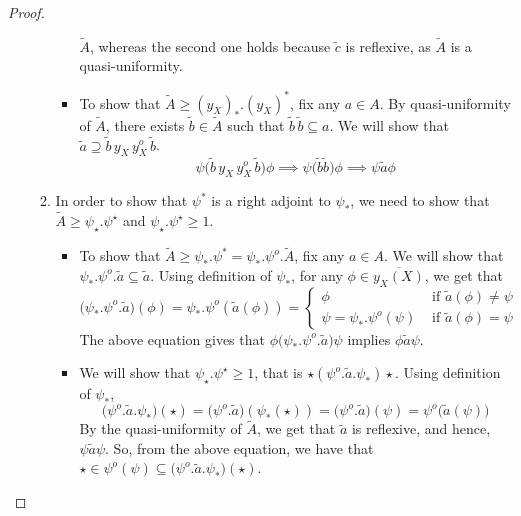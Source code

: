 \documentclass[18pt,a4paper]{article}
\theoremstyle{definition}
\begin{document}
\begin{proof}
\begin{enumerate}[label=(\roman*)]
\begin{enumerate}[label=\Roman*]
\begin{itemize}
								$\tilde{A}$, whereas the second one holds because $\tilde{c}$ is reflexive, as $\tilde{A}$ is a
								quasi-uniformity.
							\item To show that $\tilde{A} \geq (y_X^{})_*.(y_X^{})^*$, fix any $a\in A$. By
								quasi-uniformity of $\tilde{A}$, there exists $\tilde{b}\in \tilde{A}$ such that
								$\tilde{b} \, \tilde{b} \subseteq a$. We will show that $\tilde{a} \supseteq
								\tilde{b}\,y_X^{} \, y_X^{o} \, \tilde{b} $.
								\[ \psi \big(\tilde{b}\,y_X^{} \, y_X^{o} \, \tilde{b} \big) \phi
								\implies \psi \big( \tilde{b} \tilde{b} \big) \phi \implies \psi \tilde{a} \phi\]


						\end{itemize}

					\item In order to show that
						$\psi^*$ is a right adjoint to $\psi_*$,
						we need to show that
						$\tilde{A} \geq \psi_\star.\psi^\star $ and
						$\psi_\star.\psi^\star \geq 1$.
						\begin{itemize}
							\item To show that $\tilde{A}\geq \psi_*.\psi^*=\psi_*.\psi^o.\tilde{A} $,
								fix any $a\in A$. We will show that $\psi_*.\psi^o.\tilde{a} \subseteq \tilde{a}$.
								Using definition of $\psi_*$, for any $\phi \in \overline{y_X^{}(X)}$, we get that
								\[\big(\psi_*.\psi^o.\tilde{a}\big)(\phi)=
									\psi_*.\psi^o(\tilde{a}(\phi))= \begin{cases}
										\phi &\text{ if }\tilde{a} (\phi)\neq \psi \\
										\psi=\psi_*.\psi^o(\psi) &\text{ if } \tilde{a} (\phi)=\psi
									\end{cases}\]
									The above equation gives that $\phi\big(\psi_*.\psi^o.\tilde{a}\big)\psi$ implies
									$\phi \tilde{a} \psi$.
								\item We will show that $\psi_\star.\psi^\star \geq 1$, that is
									$\star(\psi^o.\tilde{a} .\psi_*)\star$. Using definition of $\psi_*$,
									\[\big(\psi^o.\tilde{a} .\psi_*\big)(\star)=\big(\psi^o.\tilde{a}\big) (\psi_*(\star))
									= \big( \psi^o.\tilde{a} \big) (\psi)=\psi^o \big( \tilde{a}(\psi)  \big) \]
									By the quasi-uniformity of $\tilde{A}$, we get that $\tilde{a}$ is reflexive, and hence,
									$\psi \tilde{a} \psi$. So, from the above equation, we have that
									$\star \in \psi^o(\psi) \subseteq \big(\psi^o.\tilde{a} .\psi_*\big)(\star) $.
							\end{itemize}
					\end{enumerate}


\end{enumerate}
\end{proof}
\end{document}
